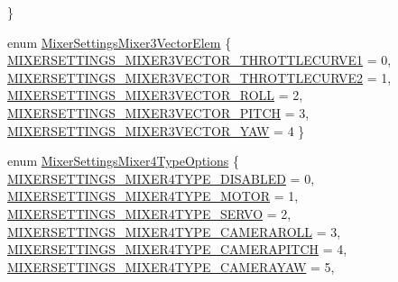 \begin{DoxyCompactItemize}
 \}
\item 
enum \hyperlink{group___mixer_settings_ga7d8db82a5e4f13b397cb5026a4d40ff9}{\-Mixer\-Settings\-Mixer3\-Vector\-Elem} \{ \*
\hyperlink{group___mixer_settings_gga7d8db82a5e4f13b397cb5026a4d40ff9ac245b13d3982001b05e8d3731a565f05}{\-M\-I\-X\-E\-R\-S\-E\-T\-T\-I\-N\-G\-S\-\_\-\-M\-I\-X\-E\-R3\-V\-E\-C\-T\-O\-R\-\_\-\-T\-H\-R\-O\-T\-T\-L\-E\-C\-U\-R\-V\-E1} = 0, 
\hyperlink{group___mixer_settings_gga7d8db82a5e4f13b397cb5026a4d40ff9ab4bd0c9e6aa26dfb9e2e0944f3773289}{\-M\-I\-X\-E\-R\-S\-E\-T\-T\-I\-N\-G\-S\-\_\-\-M\-I\-X\-E\-R3\-V\-E\-C\-T\-O\-R\-\_\-\-T\-H\-R\-O\-T\-T\-L\-E\-C\-U\-R\-V\-E2} = 1, 
\hyperlink{group___mixer_settings_gga7d8db82a5e4f13b397cb5026a4d40ff9a1b5c525b43584e06926c816aa02c39d7}{\-M\-I\-X\-E\-R\-S\-E\-T\-T\-I\-N\-G\-S\-\_\-\-M\-I\-X\-E\-R3\-V\-E\-C\-T\-O\-R\-\_\-\-R\-O\-L\-L} = 2, 
\hyperlink{group___mixer_settings_gga7d8db82a5e4f13b397cb5026a4d40ff9aa6adf95141cb873fa0f7f4eca5db61d9}{\-M\-I\-X\-E\-R\-S\-E\-T\-T\-I\-N\-G\-S\-\_\-\-M\-I\-X\-E\-R3\-V\-E\-C\-T\-O\-R\-\_\-\-P\-I\-T\-C\-H} = 3, 
\*
\hyperlink{group___mixer_settings_gga7d8db82a5e4f13b397cb5026a4d40ff9a7ee02e94d22b459bebbd0c1423153127}{\-M\-I\-X\-E\-R\-S\-E\-T\-T\-I\-N\-G\-S\-\_\-\-M\-I\-X\-E\-R3\-V\-E\-C\-T\-O\-R\-\_\-\-Y\-A\-W} = 4
 \}
\item 
enum \hyperlink{group___mixer_settings_gaa353b8171e86528c055853de97b0a170}{\-Mixer\-Settings\-Mixer4\-Type\-Options} \{ \*
\hyperlink{group___mixer_settings_ggaa353b8171e86528c055853de97b0a170a23539f3c9a726a587b1d024544521ba1}{\-M\-I\-X\-E\-R\-S\-E\-T\-T\-I\-N\-G\-S\-\_\-\-M\-I\-X\-E\-R4\-T\-Y\-P\-E\-\_\-\-D\-I\-S\-A\-B\-L\-E\-D} = 0, 
\hyperlink{group___mixer_settings_ggaa353b8171e86528c055853de97b0a170a3eae4cff0507a4b890f20f38747f4b8c}{\-M\-I\-X\-E\-R\-S\-E\-T\-T\-I\-N\-G\-S\-\_\-\-M\-I\-X\-E\-R4\-T\-Y\-P\-E\-\_\-\-M\-O\-T\-O\-R} = 1, 
\hyperlink{group___mixer_settings_ggaa353b8171e86528c055853de97b0a170a832430416bac4429d733c40277a29ad3}{\-M\-I\-X\-E\-R\-S\-E\-T\-T\-I\-N\-G\-S\-\_\-\-M\-I\-X\-E\-R4\-T\-Y\-P\-E\-\_\-\-S\-E\-R\-V\-O} = 2, 
\hyperlink{group___mixer_settings_ggaa353b8171e86528c055853de97b0a170a8bcc3d2d5d1ecb207ff2b53c52e029fa}{\-M\-I\-X\-E\-R\-S\-E\-T\-T\-I\-N\-G\-S\-\_\-\-M\-I\-X\-E\-R4\-T\-Y\-P\-E\-\_\-\-C\-A\-M\-E\-R\-A\-R\-O\-L\-L} = 3, 
\*
\hyperlink{group___mixer_settings_ggaa353b8171e86528c055853de97b0a170ad1340ad862dbd52e4fc499cc087a890b}{\-M\-I\-X\-E\-R\-S\-E\-T\-T\-I\-N\-G\-S\-\_\-\-M\-I\-X\-E\-R4\-T\-Y\-P\-E\-\_\-\-C\-A\-M\-E\-R\-A\-P\-I\-T\-C\-H} = 4, 
\hyperlink{group___mixer_settings_ggaa353b8171e86528c055853de97b0a170a89a8bc2ba20375be49568cf558b9c4c3}{\-M\-I\-X\-E\-R\-S\-E\-T\-T\-I\-N\-G\-S\-\_\-\-M\-I\-X\-E\-R4\-T\-Y\-P\-E\-\_\-\-C\-A\-M\-E\-R\-A\-Y\-A\-W} = 5, 

\end{DoxyCompactItemize}
